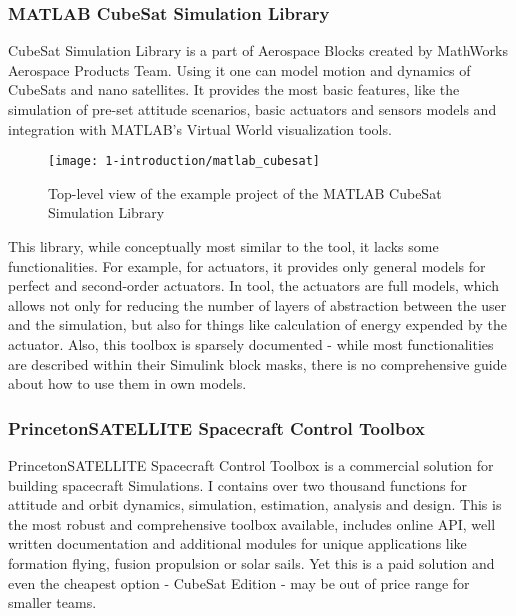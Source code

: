 
    \subsubsection{MATLAB CubeSat Simulation Library}
        CubeSat Simulation Library is a part of Aerospace Blocks created by MathWorks Aerospace Products Team. Using it one can model motion and dynamics of CubeSats and nano satellites. It provides the most basic features, like the simulation of pre-set attitude scenarios, basic actuators and sensors models and integration with MATLAB's Virtual World visualization tools.
        
        \begin{figure}[H]
            \centering
            \texttt{[image: 1-introduction/matlab\_cubesat]}
            \caption{Top-level view of the example project of the MATLAB CubeSat Simulation Library}
            \label{fig:matlab_cubesat}
        \end{figure}

        This library, while conceptually most similar to the \ac{tool}, it lacks some functionalities. For example, for actuators, it provides only general models for perfect and second-order actuators. In \ac{tool}, the actuators are full models, which allows not only for reducing the number of layers of abstraction between the user and the simulation, but also for things like calculation of energy expended by the actuator. Also, this toolbox is sparsely documented - while most functionalities are described within their Simulink block masks, there is no comprehensive guide about how to use them in own models.

    \subsubsection{PrincetonSATELLITE Spacecraft Control Toolbox}
        PrincetonSATELLITE Spacecraft Control Toolbox is a commercial solution for building spacecraft Simulations. I contains over two thousand functions for attitude and orbit dynamics, simulation, estimation, analysis and design. This is the most robust and comprehensive toolbox available, includes online API, well written documentation and additional modules for unique applications like formation flying, fusion propulsion or solar sails. Yet this is a paid solution and even the cheapest option - CubeSat Edition - may be out of price range for smaller teams.

